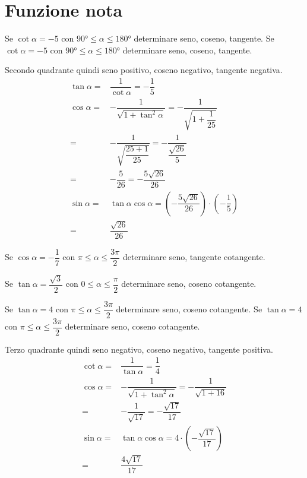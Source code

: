 \section{Funzione nota}
\begin{exercise}
Se $\cot\alpha=-5$ con $\ang{90}\leq\alpha\leq\ang{180}$ determinare seno, coseno, tangente.
\tcblower
Se $\cot\alpha=-5$ con $\ang{90}\leq\alpha\leq\ang{180}$ determinare seno, coseno, tangente.

Secondo quadrante quindi seno positivo, coseno negativo, tangente negativa.
\begin{align*}
\tan\alpha=&\dfrac{1}{\cot\alpha}=-\dfrac{1}{5}\\
\cos\alpha=&-\dfrac{1}{\sqrt{1+\tan^2\alpha}}=-\dfrac{1}{\sqrt{1+\dfrac{1}{25}}}\\
=&-\dfrac{1}{\sqrt{\dfrac{25+1}{25}}}=-\dfrac{1}{\dfrac{\sqrt{26}}{5}}\\
=&-\dfrac{5}{26}=-\dfrac{5\sqrt{26}}{26}\\
\sin\alpha=&\tan\alpha\cos\alpha=\left(-\dfrac{5\sqrt{26}}{26}\right)\cdot\left(-\dfrac{1}{5}\right)\\
=&\dfrac{\sqrt{26}}{26}
\end{align*}
\end{exercise}
\begin{exercise}[no solution]
Se $\cos\alpha=-\dfrac{1}{7}$ con $\pi\leq\alpha\leq\dfrac{3\pi}{2}$ determinare seno, tangente cotangente.
\end{exercise}
\begin{exercise}[no solution]
	Se $\tan\alpha=\dfrac{\sqrt{3}}{2}$ con $0\leq\alpha\leq\dfrac{\pi}{2}$ determinare seno, coseno cotangente.
\end{exercise}
\begin{exercise}
	Se $\tan\alpha=4$ con $\pi\leq\alpha\leq\dfrac{3\pi}{2}$ determinare seno, coseno cotangente.
\tcblower	
	Se $\tan\alpha=4$ con $\pi\leq\alpha\leq\dfrac{3\pi}{2}$ determinare seno, coseno cotangente.
	
Terzo quadrante quindi seno negativo, coseno negativo, tangente positiva.
\begin{align*}
\cot\alpha=&\dfrac{1}{\tan\alpha}=\dfrac{1}{4}\\
\cos\alpha=&-\dfrac{1}{\sqrt{1+\tan^2\alpha}}=-\dfrac{1}{\sqrt{1+16}}\\
=&-\dfrac{1}{\sqrt{17}}=-\dfrac{\sqrt{17}}{17}\\
\sin\alpha=&\tan\alpha\cos\alpha=4\cdot\left(-\dfrac{\sqrt{17}}{17}\right)\\
=&\dfrac{4\sqrt{17}}{17}
\end{align*}
\end{exercise}
